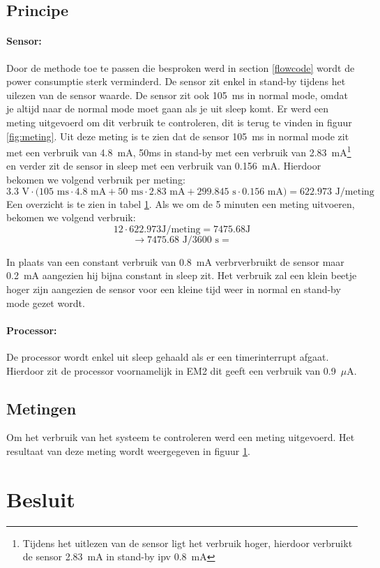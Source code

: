 \documentclass[]{article}
\begin{document}
\subsection{Principe}
\paragraph{Sensor: }
Door de methode toe te passen die besproken werd in section \ref{flowcode} wordt de power consumptie sterk verminderd. De sensor zit enkel in stand-by tijdens het uilezen van de sensor waarde. De sensor zit ook 105~ms in normal mode, omdat je altijd naar de normal mode moet gaan als je uit sleep komt. Er werd een meting uitgevoerd om dit verbruik te controleren, dit is terug te vinden in figuur \ref{fig:meting}. Uit deze meting is te zien dat de sensor 105~ms in normal mode zit met een verbruik van 4.8~mA, 50ms in stand-by met een verbruik van 2.83~mA\footnote{Tijdens het uitlezen van de sensor ligt het verbruik hoger, hierdoor verbruikt de sensor 2.83~mA in stand-by ipv 0.8~mA} en verder zit de sensor in sleep met een verbruik van 0.156~mA. Hierdoor bekomen we volgend verbruik per meting:
\begin{equation}
	 3.3\text{ V}\cdot\big(105\text{ ms} \cdot 4.8 \text{ mA} + 50\text{ ms}\cdot 2.83\text{ mA}+299.845\text{ s}\cdot 0.156\text{ mA}\big) = 622.973 \text{ J/meting}
\end{equation}
Een overzicht is te zien in tabel \ref{}.
Als we om de 5 minuten een meting uitvoeren, bekomen we volgend verbruik:
\begin{equation}
	12\cdot 622.973 \text{J/meting} = 7475.68 \text{J} 
\end{equation}
\begin{equation}
	\rightarrow 7475.68\text{ J}/3600\text{ s} = 
\end{equation}




In plaats van een constant verbruik van 0.8~mA verbrverbruikt de sensor maar 0.2~mA aangezien hij bijna constant in sleep zit. Het verbruik zal een klein beetje hoger zijn aangezien de sensor voor een kleine tijd weer in normal en stand-by mode gezet wordt. 
\paragraph{Processor: }
De processor wordt enkel uit sleep gehaald als er een timerinterrupt afgaat. Hierdoor zit de processor voornamelijk in EM2 dit geeft een verbruik van 0.9~$\mu$A.
\subsection{Metingen}
Om het verbruik van het systeem te controleren werd een meting uitgevoerd. Het resultaat van deze meting wordt weergegeven in figuur \ref{}.







\section{Besluit }
\end{document}

